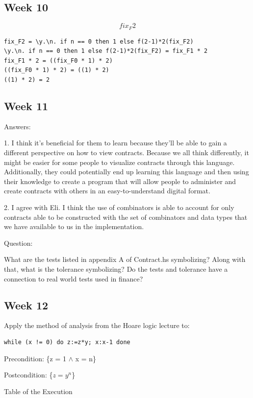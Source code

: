 \documentclass{article}
\theoremstyle{theorem}
\theoremstyle{definition}
\theoremstyle{remark}
\begin{document}
\subsection{Week 10}
\[fix_F2\]

\begin{verbatim}
fix_F2 = \y.\n. if n == 0 then 1 else f(2-1)*2(fix_F2)
\y.\n. if n == 0 then 1 else f(2-1)*2(fix_F2) = fix_F1 * 2
fix_F1 * 2 = ((fix_F0 * 1) * 2)
((fix_F0 * 1) * 2) = ((1) * 2)
((1) * 2) = 2
\end{verbatim}

\subsection{Week 11}

\noindent
Answers{:}

1. I think it's beneficial for them to learn because they'll be able to gain a different perspective on how to view contracts. Because we all think differently, it might be easier for some people to visualize contracts through this language. Additionally, they could potentially end up learning this language and then using their knowledge to create a program that will allow people to administer and create contracts with others in an easy-to-understand digital format.
\smallskip

2. I agree with Eli. I think the use of combinators is able to account for only contracts able to be constructed with the set of combinators and data types that we have available to us in the implementation.
\smallskip
\smallskip

\noindent
Question{:}

What are the tests listed in appendix A of Contract.hs symbolizing? Along with that, what is the tolerance symbolizing? Do the tests and tolerance have a connection to real world tests used in finance?

\subsection{Week 12}
Apply the method of analysis from the Hoare logic lecture to:
\begin{verbatim}
while (x != 0) do z:=z*y; x:x-1 done
\end{verbatim}

Precondition: \{z = 1 $\wedge$ x = n\}
\smallskip
\smallskip

Postcondition: \{$z=y^{n}$\}
\smallskip
\smallskip

Table of the Execution
\end{document}
